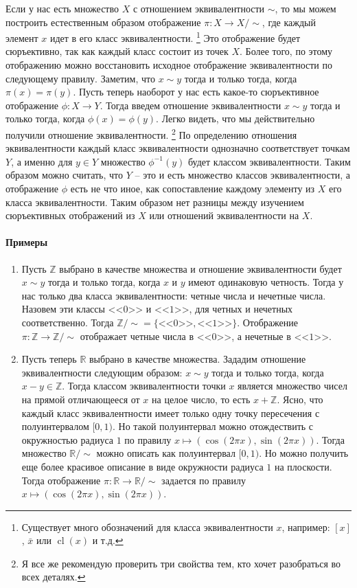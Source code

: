 Если у нас есть множество $X$ с отношением эквивалентности $\sim$, то мы можем построить естественным образом отображение $\pi\colon X\to X/{\sim}$, где каждый элемент $x$ идет в его класс эквивалентности.%
\footnote{Существует много обозначений для класса эквивалентности $x$, например: $[x]$, $\bar x$ или $\operatorname{cl}(x)$ и т.д.}
Это отображение будет сюръективно, так как каждый класс состоит из точек $X$.
Более того, по этому отображению можно восстановить исходное отображение эквивалентности по следующему правилу.
Заметим, что $x\sim y$ тогда и только тогда, когда $\pi(x) = \pi(y)$.
Пусть теперь наоборот у нас есть какое-то сюръективное отображение $\phi\colon X\to Y$.
Тогда введем отношение эквивалентности $x\sim y$ тогда и только тогда, когда $\phi(x) = \phi(y)$.
Легко видеть, что мы действительно получили отношение эквивалентности.%
\footnote{Я все же рекомендую проверить три свойства тем, кто хочет разобраться во всех деталях.}
По определению отношения эквивалентности каждый класс эквивалентности однозначно соответствует точкам $Y$, а именно для $y\in Y$ множество $\phi^{-1}(y)$ будет классом эквивалентности.
Таким образом можно считать, что $Y$ -- это и есть множество классов эквивалентности, а отображение $\phi$ есть не что иное, как сопоставление каждому элементу из $X$ его класса эквивалентности.
Таким образом нет разницы между изучением сюръективных отображений из $X$ или отношений эквивалентности на $X$.

\paragraph{Примеры}

\begin{enumerate}
\item Пусть $\mathbb Z$ выбрано в качестве множества и отношение эквивалентности будет $x\sim y$ тогда и только тогда, когда $x$ и $y$ имеют одинаковую четность.
Тогда у нас только два класса эквивалентности: четные числа и нечетные числа.
Назовем эти классы <<$0$>> и <<$1$>>, для четных и нечетных соответственно.
Тогда $\mathbb Z/{\sim} = \{\text{<<$0$>>},\text{<<$1$>>}\}$.
Отображение $\pi \colon \mathbb Z\to \mathbb Z/{\sim}$ отображает четные числа в <<$0$>>, а нечетные в <<$1$>>.

\item Пусть теперь $\mathbb R$ выбрано в качестве множества.
Зададим отношение эквивалентности следующим образом: $x\sim y$ тогда и только тогда, когда $x - y \in \mathbb Z$.
Тогда классом эквивалентности точки $x$ является множество чисел на прямой отличающееся от $x$ на целое число, то есть $x + \mathbb Z$.
Ясно, что каждый класс эквивалентности имеет только одну точку пересечения с полуинтервалом $[0, 1)$.
Но такой полуинтервал можно отождествить с окружностью радиуса $1$ по правилу $x\mapsto (\cos(2\pi x), \sin(2\pi x))$.
Тогда множество $\mathbb R/{\sim}$ можно описать как полуинтервал $[0, 1)$.
Но можно получить еще более красивое описание в виде окружности радиуса $1$ на плоскости.
Тогда отображение $\pi \colon \mathbb R\to \mathbb R/{\sim}$ задается по правилу $x \mapsto (\cos(2\pi x), \sin(2\pi x))$.
\end{enumerate}

